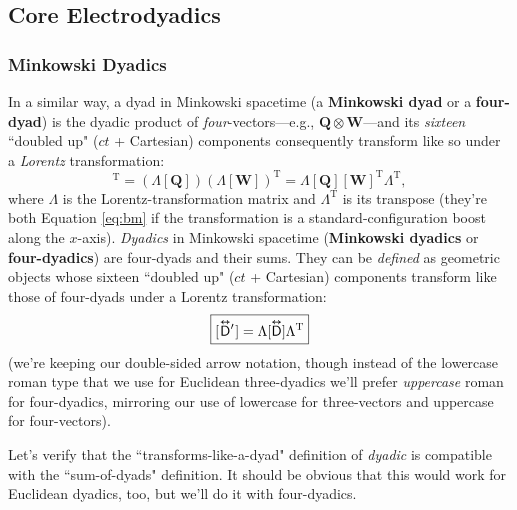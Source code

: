\documentclass[12pt]{article}
\renewcommand{\vv}[1]{\mathbf{#1}}
\newcommand{\capdy}[1]{ \overset{ \text{\tiny$\bm\leftrightarrow$} }{\vphantom{\text{\small{A}}}\smash{#1}} }
\begin{document}
\subsection{Core Electrodyadics}\label{ssec:mfd}

\subsubsection{Minkowski Dyadics}

In a similar way, a dyad in Minkowski spacetime (a \textbf{Minkowski dyad} or a \textbf{four-dyad}) is the dyadic product of \emph{four}-vectors---e.g., $\vv Q \otimes \vv W$---and its \emph{sixteen} ``doubled up" ($ct$ + Cartesian) components consequently transform like so under a \emph{Lorentz} transformation:
\begin{equation*}
[\vv Q^\prime \mkern1mu ] [\vv W^\prime \mkern1mu ]^{\mathrm{T}} = ( \Lambda [\vv Q] ) ( \Lambda [\vv W] )^\mathrm{T} = \Lambda [\vv Q] [\vv W]^{\mathrm{T}} \Lambda^{\mathrm{T}} ,
\end{equation*}
where $\Lambda$ is the Lorentz-transformation matrix and $\Lambda^{\mathrm{T}}$ is its transpose (they're both Equation \ref{eq:bm} if the transformation is a standard-configuration boost along the $x$-axis). \emph{Dyadics} in Minkowski spacetime (\textbf{Minkowski dyadics} or \textbf{four-dyadics}) are four-dyads and their sums. They can be \emph{defined} as geometric objects whose sixteen ``doubled up" ($ct$ + Cartesian) components transform like those of four-dyads under a Lorentz transformation:
\begin{equation}\label{eq:ltd}
\boxed{ [ \mkern1mu {\capdy{\mathsf{D}} {\vphantom{D}}^\prime} \mkern1mu ] = \Lambda [ \capdy{\mathsf{D}} ] \Lambda^{\mathrm{T}}}
\end{equation}
(we're keeping our double-sided arrow notation, though instead of the lowercase roman type that we use for Euclidean three-dyadics we'll prefer \emph{uppercase} roman for four-dyadics, mirroring our use of lowercase for three-vectors and uppercase for four-vectors).

Let's verify that the ``transforms-like-a-dyad" definition of \emph{dyadic} is compatible with the ``sum-of-dyads" definition. It should be obvious that this would work for Euclidean dyadics, too, but we'll do it with four-dyadics.
\end{document}
